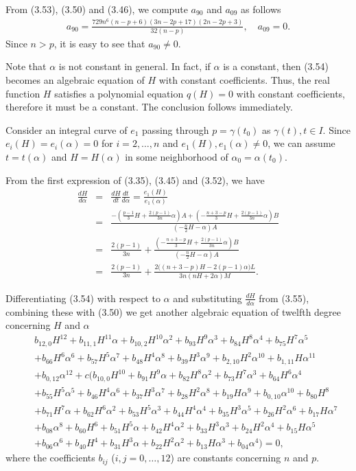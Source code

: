 \documentclass[twoside,reqno,A4]{amsart}
\theoremstyle{definition}
\theoremstyle{remark}
\numberwithin{equation}{section}
\begin{document}
From (3.53), (3.50) and (3.46), we compute $a_{90}$ and $a_{09}$ as
follows
\begin{eqnarray*}
a_{90}=\frac{729n^6(n-p+6)(3n-2p+17)(2n-2p+3)}{32(n-p)}, \quad
a_{09}=0.
\end{eqnarray*}
Since $n>p$, it is easy to see that $a_{90}\neq0$.

Note that $\alpha$ is not constant in general. In fact, if $\alpha$
is a constant, then (3.54) becomes an algebraic equation of $H$ with
constant coefficients. Thus, the real function $H$ satisfies a
polynomial equation $q(H)=0$ with constant coefficients, therefore
it must be a constant. The conclusion follows immediately.

Consider an integral curve of $e_1$ passing through $p=\gamma(t_0)$
as $\gamma(t), t\in I$. Since $e_i(H)=e_i(\alpha)=0$ for
$i=2,\ldots, n$ and $e_1(H), e_1(\alpha)\neq0$, we can assume
$t=t(\alpha)$ and $H=H(\alpha)$ in some neighborhood of
$\alpha_0=\alpha(t_0)$.

From the first expression of (3.35), (3.45) and (3.52), we have
\begin{eqnarray}
\frac{dH}{d\alpha}&=&\frac{dH}{dt}\frac{dt}{d\alpha}=\frac{e_1(H)}{e_1(\alpha)}\nonumber\\
&=&\frac{-(\frac{p-1}{3}H+\frac{2(p-1)}{3n}\alpha)A+(-\frac{n+3-p}{3}H+\frac{2(p-1)}{3n}\alpha)B}{(-\frac{n}{2}H-\alpha)A}\nonumber\\
&=&\frac{2(p-1)}{3n}+\frac{(-\frac{n+3-p}{3}H+\frac{2(p-1)}{3n}\alpha)B}{(-\frac{n}{2}H-\alpha)A}\nonumber\\
&=&\frac{2(p-1)}{3n}+\frac{2\big((n+3-p)H-2(p-1)\alpha\big)L}{3n(nH+2\alpha)M}.
\end{eqnarray}

Differentiating (3.54) with respect to $\alpha$ and substituting
$\frac{dH}{d\alpha}$ from (3.55), combining these with (3.50) we get
another algebraic equation of twelfth degree concerning $H$ and
$\alpha$
\begin{eqnarray}
&&b_{12,0}H^{12}+b_{11,1}H^{11}\alpha+b_{10,2}H^{10}\alpha^2+b_{93}H^9\alpha^3+b_{84}H^8\alpha^4
+b_{75}H^7\alpha^5\nonumber\\
&&+b_{66}H^6\alpha^6+b_{57}H^5\alpha^7+b_{48}H^4\alpha^8+b_{39}H^3\alpha^9+b_{2,10}H^2\alpha^{10}+b_{1,11}H\alpha^{11}\nonumber\\
&&+b_{0,12}\alpha^{12}+c(b_{10,0}H^{10}+b_{91}H^9\alpha+b_{82}H^8\alpha^2+b_{73}H^7\alpha^3+b_{64}H^6\alpha^4
\nonumber\\
&&+b_{55}H^5\alpha^5+b_{46}H^4\alpha^6+b_{37}H^3\alpha^7+b_{28}H^2\alpha^8+b_{19}H\alpha^9+b_{0,10}\alpha^{10}+b_{80}H^8\nonumber\\
&&+b_{71}H^7\alpha+b_{62}H^6\alpha^2+b_{53}H^5\alpha^3+b_{44}H^4\alpha^4+b_{35}H^3\alpha^5+b_{26}H^2\alpha^6+b_{17}H\alpha^7\nonumber\\
&&+b_{08}\alpha^8+b_{60}H^6+b_{51}H^5\alpha+b_{42}H^4\alpha^2+b_{33}H^3\alpha^3+b_{24}H^2\alpha^4+b_{15}H\alpha^5\nonumber\\
&&+b_{06}\alpha^6+b_{40}H^4+b_{31}H^3\alpha+b_{22}H^2\alpha^2+b_{13}H\alpha^3+b_{04}\alpha^4)=0,
\end{eqnarray}
where the coefficients $b_{ij}$ ($i, j=0,\ldots,12$) are constants
concerning $n$ and $p$.
\end{document}
